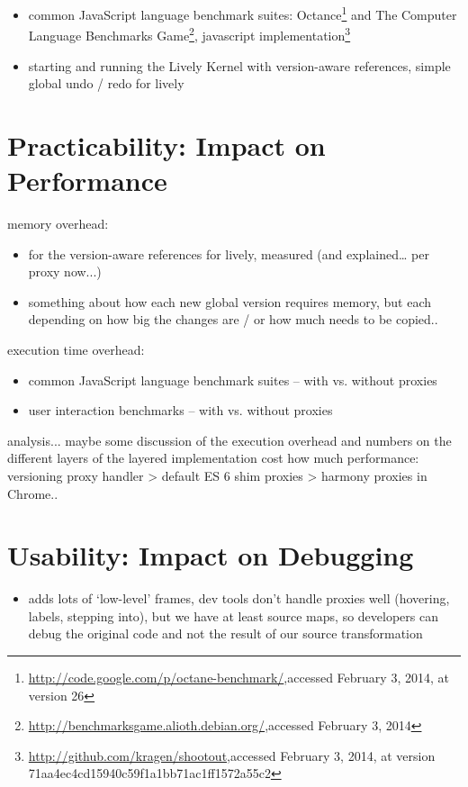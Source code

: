 \begin{itemize}
    \item common JavaScript language benchmark suites: Octance\footnote{\url{http://code.google.com/p/octane-benchmark/},\goodbreak accessed February 3, 2014, at version 26} and The Computer Language Benchmarks Game\footnote{\url{http://benchmarksgame.alioth.debian.org/},\goodbreak accessed February 3, 2014}, javascript implementation\footnote{\url{http://github.com/kragen/shootout},\goodbreak accessed February 3, 2014, at version 71aa4ec4cd15940c59f1a1bb71ac1ff1572a55c2}
    \item starting and running the Lively Kernel with version-aware references, simple global undo / redo for lively
\end{itemize}



\section{Practicability: Impact on Performance}

memory overhead:
\begin{itemize}
    \item for the version-aware references for lively, measured (and explained… per proxy now...)
    \item something about how each new global version requires memory, but each depending on how big the changes are / or how much needs to be copied..
\end{itemize}


execution time overhead:
\begin{itemize}
    \item common JavaScript language benchmark suites – with vs. without proxies
    \item user interaction benchmarks – with vs. without proxies
\end{itemize}


analysis...
maybe some discussion of the execution overhead and numbers on the different layers of the layered implementation cost how much performance: versioning proxy handler > default ES 6 shim proxies > harmony proxies in Chrome..



\section{Usability: Impact on Debugging}

\begin{itemize}
    \item adds lots of ‘low-level’ frames, dev tools don’t handle proxies well (hovering, labels, stepping into), but we have at least source maps, so developers can debug the original code and not the result of our source transformation
\end{itemize}
